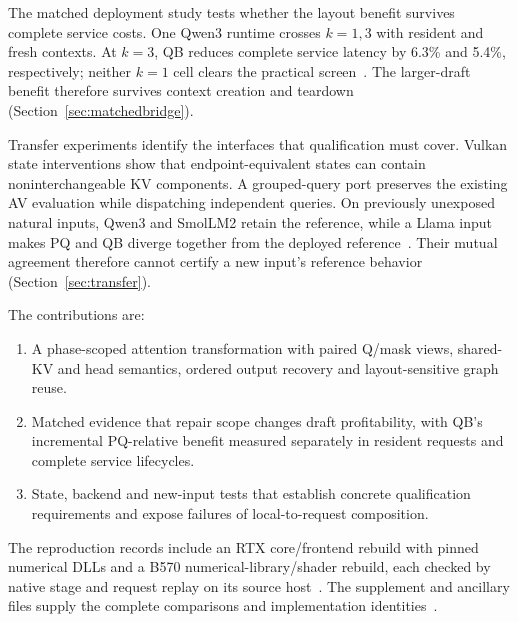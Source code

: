 The matched deployment study tests whether the layout benefit survives complete service costs. One Qwen3 runtime crosses $k=1,3$ with resident and fresh contexts. At $k=3$, QB reduces complete service latency by 6.3\% and 5.4\%, respectively; neither $k=1$ cell clears the practical screen~\cite{rtxnativebridge}. The larger-draft benefit therefore survives context creation and teardown (Section~\ref{sec:matchedbridge}).

Transfer experiments identify the interfaces that qualification must cover. Vulkan state interventions show that endpoint-equivalent states can contain noninterchangeable KV components. A grouped-query port preserves the existing AV evaluation while dispatching independent queries. On previously unexposed natural inputs, Qwen3 and SmolLM2 retain the reference, while a Llama input makes PQ and QB diverge together from the deployed reference~\cite{rtxtransferrecords}. Their mutual agreement therefore cannot certify a new input's reference behavior (Section~\ref{sec:transfer}).

The contributions are:
\begin{enumerate}[label=(\arabic*),itemsep=2pt]
\item A phase-scoped attention transformation with paired Q/mask views, shared-KV and head semantics, ordered output recovery and layout-sensitive graph reuse.
\item Matched evidence that repair scope changes draft profitability, with QB's incremental PQ-relative benefit measured separately in resident requests and complete service lifecycles.
\item State, backend and new-input tests that establish concrete qualification requirements and expose failures of local-to-request composition.
\end{enumerate}
The reproduction records include an RTX core/frontend rebuild with pinned numerical DLLs and a B570 numerical-library/shader rebuild, each checked by native stage and request replay on its source host~\cite{rtxnativebridge,b570nativereproduction}. The supplement and ancillary files supply the complete comparisons and implementation identities~\cite{studyrecords}.
